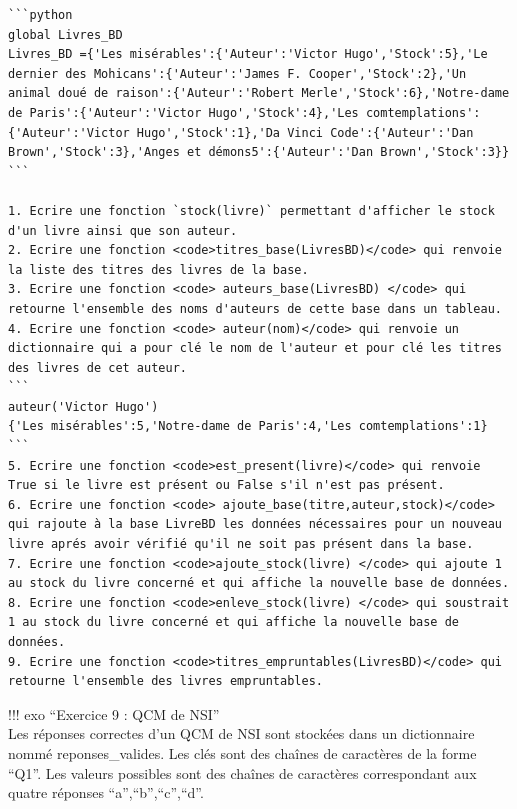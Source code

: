 \documentclass[
]{article}
\begin{document}
\begin{verbatim}
```python
global Livres_BD
Livres_BD ={'Les misérables':{'Auteur':'Victor Hugo','Stock':5},'Le dernier des Mohicans':{'Auteur':'James F. Cooper','Stock':2},'Un animal doué de raison':{'Auteur':'Robert Merle','Stock':6},'Notre-dame de Paris':{'Auteur':'Victor Hugo','Stock':4},'Les comtemplations':{'Auteur':'Victor Hugo','Stock':1},'Da Vinci Code':{'Auteur':'Dan Brown','Stock':3},'Anges et démons5':{'Auteur':'Dan Brown','Stock':3}}
```

1. Ecrire une fonction `stock(livre)` permettant d'afficher le stock d'un livre ainsi que son auteur.
2. Ecrire une fonction <code>titres_base(LivresBD)</code> qui renvoie la liste des titres des livres de la base.
3. Ecrire une fonction <code> auteurs_base(LivresBD) </code> qui retourne l'ensemble des noms d'auteurs de cette base dans un tableau.
4. Ecrire une fonction <code> auteur(nom)</code> qui renvoie un dictionnaire qui a pour clé le nom de l'auteur et pour clé les titres des livres de cet auteur.
```
auteur('Victor Hugo')
{'Les misérables':5,'Notre-dame de Paris':4,'Les comtemplations':1}
```
5. Ecrire une fonction <code>est_present(livre)</code> qui renvoie True si le livre est présent ou False s'il n'est pas présent.
6. Ecrire une fonction <code> ajoute_base(titre,auteur,stock)</code> qui rajoute à la base LivreBD les données nécessaires pour un nouveau livre aprés avoir vérifié qu'il ne soit pas présent dans la base.
7. Ecrire une fonction <code>ajoute_stock(livre) </code> qui ajoute 1 au stock du livre concerné et qui affiche la nouvelle base de données.
8. Ecrire une fonction <code>enleve_stock(livre) </code> qui soustrait 1 au stock du livre concerné et qui affiche la nouvelle base de données.
9. Ecrire une fonction <code>titres_empruntables(LivresBD)</code> qui retourne l'ensemble des livres empruntables.
\end{verbatim}

!!! exo ``Exercice 9 : QCM de NSI''\\
Les réponses correctes d'un QCM de NSI sont stockées dans un
dictionnaire nommé reponses\_valides. Les clés sont des chaînes de
caractères de la forme ``Q1''. Les valeurs possibles sont des chaînes de
caractères correspondant aux quatre réponses ``a'',``b'',``c'',``d''.
\end{document}
